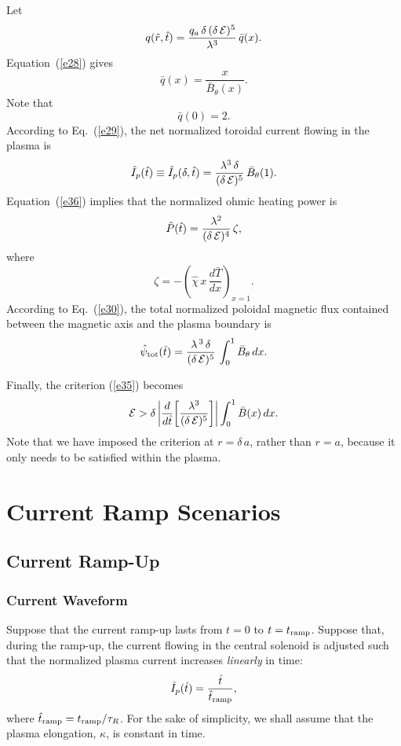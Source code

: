 \documentclass[12pt,prb,aps]{revtex4-1}
\begin{document}
Let
\begin{equation}
q(\hat{r},\hat{t}) =\frac{q_a\,\delta\,(\delta\,{\cal E})^5}{\lambda^3}\,\bar{q}(x).
\end{equation}
Equation~(\ref{e28}) gives
\begin{equation}
\bar{q}(x) = \frac{x}{\bar{B}_\theta(x)}.
\end{equation}
Note that
\begin{equation}
\bar{q}(0)= 2.
\end{equation}
According to Eq.~(\ref{e29}), the net normalized toroidal current flowing in the plasma is
\begin{equation}
\hat{I}_p(\hat{t}) \equiv \hat{I}_p(\delta,\hat{t})= \frac{\lambda^3\,\delta}{(\delta\,{\cal E})^5}\,\bar{B}_\theta(1).
\end{equation}
Equation~(\ref{e36}) implies that the normalized ohmic heating power is
\begin{equation}
\hat{P}(\hat{t})= \frac{\lambda^2}{(\delta\,{\cal E})^4}\,\zeta,
\end{equation}
where
\begin{equation}
\zeta = - \left(\hat{\chi}\,x\,\frac{d\bar{T}}{dx}\right)_{x=1}.
\end{equation}
According to Eq.~(\ref{e30}), the total normalized poloidal magnetic flux contained between the magnetic axis and the plasma
boundary is
\begin{equation}
\hat{\psi}_{\rm tot}(\hat{t}) = \frac{\lambda^{\,3}\,\delta}{(\delta\,{\cal E})^5}\,\int_0^1\bar{B}_\theta\,dx.
\end{equation}

Finally, the criterion (\ref{e35}) becomes 
\begin{equation}\label{e55}
{\cal E}> \delta\left|\frac{d}{d\hat{t}}\!\left[\frac{\lambda^3}{(\delta\,{\cal E})^5}\right]\right|\int_0^1\bar{B}(x)\,dx.
\end{equation}
Note that we have imposed the criterion at $r=\delta\,a$, rather than $r=a$, because it only needs to be satisfied
within the plasma. 

\section{Current Ramp Scenarios}
\subsection{Current Ramp-Up}
\subsubsection{Current Waveform}
Suppose that the current ramp-up lasts from $t=0$ to $t=t_{\rm ramp}$. Suppose that, during the ramp-up, the current flowing in the central solenoid is adjusted such that
the normalized plasma current increases {\em linearly}\/ in time:
\begin{equation}\label{e56}
\hat{I}_p(\hat{t}) = \frac{\hat{t}}{\hat{t}_{\rm ramp}},
\end{equation}
where $\hat{t}_{\rm ramp} =t_{\rm ramp}/\tau_R$. For the sake of simplicity, we shall assume that the plasma elongation, $\kappa$,  is constant in time. 
\end{document}

